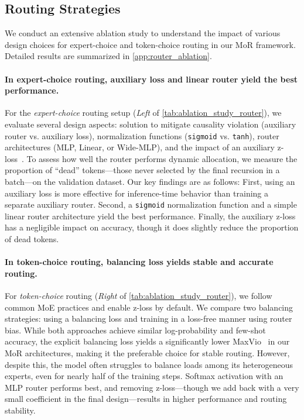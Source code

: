 \subsection{Routing Strategies}
\label{subsec:ablation_routing}

We conduct an extensive ablation study to understand the impact of various design choices for expert-choice and token-choice routing in our MoR framework. Detailed results are summarized in \autoref{app:router_ablation}.


\vspace{-10pt}
\paragraph{In expert-choice routing, auxiliary loss and linear router yield the best performance.}

For the \textit{expert-choice} routing setup (\textit{Left} of \autoref{tab:ablation_study_router}), we evaluate several design aspects: solution to mitigate causality violation (auxiliary router vs. auxiliary loss), normalization functions (\texttt{sigmoid} vs. \texttt{tanh}), router architectures (MLP, Linear, or Wide-MLP), and the impact of an auxiliary z-loss~\citep{zoph2022st}. To assess how well the router performs dynamic allocation, we measure the proportion of ``dead'' tokens—those never selected by the final recursion in a batch—on the validation dataset. Our key findings are as follows: First, using an auxiliary loss is more effective for inference-time behavior than training a separate auxiliary router. Second, a \texttt{sigmoid} normalization function and a simple linear router architecture yield the best performance. Finally, the auxiliary z-loss has a negligible impact on accuracy, though it does slightly reduce the proportion of dead tokens. 




\vspace{-10pt}
\paragraph{In token-choice routing, balancing loss yields stable and accurate routing.}
For \textit{token-choice} routing (\textit{Right} of \autoref{tab:ablation_study_router}), we follow common MoE practices and enable z-loss by default. We compare two balancing strategies: using a balancing loss and training in a loss-free manner using router bias. While both approaches achieve similar log-probability and few-shot accuracy, the explicit balancing loss yields a significantly lower MaxVio~\citep{wang2024auxiliary} in our MoR architectures, making it the preferable choice for stable routing. However, despite this, the model often struggles to balance loads among its heterogeneous experts, even for nearly half of the training steps. Softmax activation with an MLP router performs best, and removing z-loss—though we add back with a very small coefficient in the final design—results in higher performance and routing stability.


